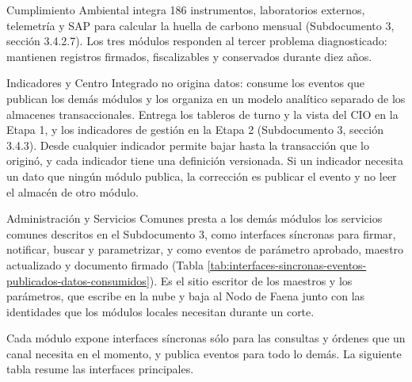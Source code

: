 \documentclass[subdoc]{../../comun/overfore}
\begin{document}
Cumplimiento Ambiental integra 186 instrumentos, laboratorios externos, telemetría y SAP para calcular la huella de carbono mensual (Subdocumento 3, sección 3.4.2.7). Los tres módulos responden al tercer problema diagnosticado: mantienen registros firmados, fiscalizables y conservados durante diez años.

Indicadores y Centro Integrado no origina datos: consume los eventos que publican los demás módulos y los organiza en un modelo analítico separado de los almacenes transaccionales. Entrega los tableros de turno y la vista del CIO en la Etapa 1, y los indicadores de gestión en la Etapa 2 (Subdocumento 3, sección 3.4.3). Desde cualquier indicador permite bajar hasta la transacción que lo originó, y cada indicador tiene una definición versionada. Si un indicador necesita un dato que ningún módulo publica, la corrección es publicar el evento y no leer el almacén de otro módulo.

Administración y Servicios Comunes presta a los demás módulos los servicios comunes descritos en el Subdocumento 3, como interfaces síncronas para firmar, notificar, buscar y parametrizar, y como eventos de parámetro aprobado, maestro actualizado y documento firmado (Tabla \ref{tab:interfaces-sincronas-eventos-publicados-datos-consumidos}). Es el sitio escritor de los maestros y los parámetros, que escribe en la nube y baja al Nodo de Faena junto con las identidades que los módulos locales necesitan durante un corte.

Cada módulo expone interfaces síncronas sólo para las consultas y órdenes que un canal necesita en el momento, y publica eventos para todo lo demás. La siguiente tabla resume las interfaces principales.
\end{document}
